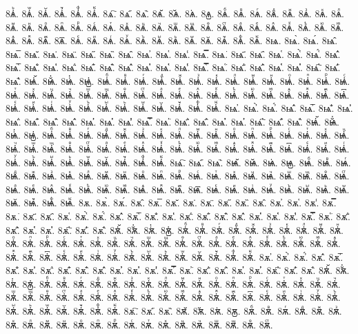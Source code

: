 {8ѧ҆ꙺ.
8ѧ҆ꙻ.
8ѧ҆꙼.
8ѧ҆꙽.
8ѧ҆ꚞ.
8ѧ҆ꚟ.
8ѧ҇.
8ѧ᷀.
8ѧ᷁.
8ѧ᷶.
8ѧ᷷.
8ѧ᷸.
8ѧ᷹.
8ѧⷠ.
8ѧⷡ.
8ѧⷢ.
8ѧⷣ.
8ѧⷤ.
8ѧⷥ.
8ѧⷦ.
8ѧⷧ.
8ѧⷨ.
8ѧⷩ.
8ѧⷪ.
8ѧⷫ.
8ѧⷬ.
8ѧⷭ.
8ѧⷮ.
8ѧⷯ.
8ѧⷰ.
8ѧⷱ.
8ѧⷲ.
8ѧⷳ.
8ѧⷴ.
8ѧⷵ.
8ѧⷶ.
8ѧⷷ.
8ѧⷸ.
8ѧⷹ.
8ѧⷺ.
8ѧⷻ.
8ѧⷼ.
8ѧⷽ.
8ѧⷾ.
8ѧⷿ.
8ѧ꙯.
8ѧꙴ.
8ѧꙵ.
8ѧꙶ.
8ѧꙷ.
8ѧꙸ.
8ѧꙹ.
8ѧꙺ.
8ѧꙻ.
8ѧ꙼.
8ѧ꙽.
8ѧꚞ.
8ѧꚟ.
8ѩ.
8ѩ̀.
8ѩ́.
8ѩ̂.
8ѩ̅.
8ѩ̆.
8ѩ̇.
8ѩ̈.
8ѩ̋.
8ѩ̏.
8ѩ̑.
8ѩ̓.
8ѩ̔.
8ѩ̾.
8ѩ̿.
8ѩ͘.
8ѩ҃.
8ѩ҄.
8ѩ҅.
8ѩ҅̀.
8ѩ҅́.
8ѩ҅̂.
8ѩ҅̅.
8ѩ҅̆.
8ѩ҅̇.
8ѩ҅̈.
8ѩ҅̋.
8ѩ҅̏.
8ѩ҅̑.
8ѩ҅̓.
8ѩ҅̔.
8ѩ҅̾.
8ѩ҅̿.
8ѩ҅͘.
8ѩ҅҃.
8ѩ҅҄.
8ѩ҅҅.
8ѩ҅҆.
8ѩ҅҇.
8ѩ҅᷀.
8ѩ҅᷁.
8ѩ҅᷶.
8ѩ᷷҅.
8ѩ᷸҅.
8ѩ᷹҅.
8ѩ҅ⷠ.
8ѩ҅ⷡ.
8ѩ҅ⷢ.
8ѩ҅ⷣ.
8ѩ҅ⷤ.
8ѩ҅ⷥ.
8ѩ҅ⷦ.
8ѩ҅ⷧ.
8ѩ҅ⷨ.
8ѩ҅ⷩ.
8ѩ҅ⷪ.
8ѩ҅ⷫ.
8ѩ҅ⷬ.
8ѩ҅ⷭ.
8ѩ҅ⷮ.
8ѩ҅ⷯ.
8ѩ҅ⷰ.
8ѩ҅ⷱ.
8ѩ҅ⷲ.
8ѩ҅ⷳ.
8ѩ҅ⷴ.
8ѩ҅ⷵ.
8ѩ҅ⷶ.
8ѩ҅ⷷ.
8ѩ҅ⷸ.
8ѩ҅ⷹ.
8ѩ҅ⷺ.
8ѩ҅ⷻ.
8ѩ҅ⷼ.
8ѩ҅ⷽ.
8ѩ҅ⷾ.
8ѩ҅ⷿ.
8ѩ҅꙯.
8ѩ҅ꙴ.
8ѩ҅ꙵ.
8ѩ҅ꙶ.
8ѩ҅ꙷ.
8ѩ҅ꙸ.
8ѩ҅ꙹ.
8ѩ҅ꙺ.
8ѩ҅ꙻ.
8ѩ҅꙼.
8ѩ҅꙽.
8ѩ҅ꚞ.
8ѩ҅ꚟ.
8ѩ҆.
8ѩ҆̀.
8ѩ҆́.
8ѩ҆̂.
8ѩ҆̅.
8ѩ҆̆.
8ѩ҆̇.
8ѩ҆̈.
8ѩ҆̋.
8ѩ҆̏.
8ѩ҆̑.
8ѩ҆̓.
8ѩ҆̔.
8ѩ҆̾.
8ѩ҆̿.
8ѩ҆͘.
8ѩ҆҃.
8ѩ҆҄.
8ѩ҆҅.
8ѩ҆҆.
8ѩ҆҇.
8ѩ҆᷀.
8ѩ҆᷁.
8ѩ҆᷶.
8ѩ᷷҆.
8ѩ᷸҆.
8ѩ᷹҆.
8ѩ҆ⷠ.
8ѩ҆ⷡ.
8ѩ҆ⷢ.
8ѩ҆ⷣ.
8ѩ҆ⷤ.
8ѩ҆ⷥ.
8ѩ҆ⷦ.
8ѩ҆ⷧ.
8ѩ҆ⷨ.
8ѩ҆ⷩ.
8ѩ҆ⷪ.
8ѩ҆ⷫ.
8ѩ҆ⷬ.
8ѩ҆ⷭ.
8ѩ҆ⷮ.
8ѩ҆ⷯ.
8ѩ҆ⷰ.
8ѩ҆ⷱ.
8ѩ҆ⷲ.
8ѩ҆ⷳ.
8ѩ҆ⷴ.
8ѩ҆ⷵ.
8ѩ҆ⷶ.
8ѩ҆ⷷ.
8ѩ҆ⷸ.
8ѩ҆ⷹ.
8ѩ҆ⷺ.
8ѩ҆ⷻ.
8ѩ҆ⷼ.
8ѩ҆ⷽ.
8ѩ҆ⷾ.
8ѩ҆ⷿ.
8ѩ҆꙯.
8ѩ҆ꙴ.
8ѩ҆ꙵ.
8ѩ҆ꙶ.
8ѩ҆ꙷ.
8ѩ҆ꙸ.
8ѩ҆ꙹ.
8ѩ҆ꙺ.
8ѩ҆ꙻ.
8ѩ҆꙼.
8ѩ҆꙽.
8ѩ҆ꚞ.
8ѩ҆ꚟ.
8ѩ҇.
8ѩ᷀.
8ѩ᷁.
8ѩ᷶.
8ѩ᷷.
8ѩ᷸.
8ѩ᷹.
8ѩⷠ.
8ѩⷡ.
8ѩⷢ.
8ѩⷣ.
8ѩⷤ.
8ѩⷥ.
8ѩⷦ.
8ѩⷧ.
8ѩⷨ.
8ѩⷩ.
8ѩⷪ.
8ѩⷫ.
8ѩⷬ.
8ѩⷭ.
8ѩⷮ.
8ѩⷯ.
8ѩⷰ.
8ѩⷱ.
8ѩⷲ.
8ѩⷳ.
8ѩⷴ.
8ѩⷵ.
8ѩⷶ.
8ѩⷷ.
8ѩⷸ.
8ѩⷹ.
8ѩⷺ.
8ѩⷻ.
8ѩⷼ.
8ѩⷽ.
8ѩⷾ.
8ѩⷿ.
8ѩ꙯.
8ѩꙴ.
8ѩꙵ.
8ѩꙶ.
8ѩꙷ.
8ѩꙸ.
8ѩꙹ.
8ѩꙺ.
8ѩꙻ.
8ѩ꙼.
8ѩ꙽.
8ѩꚞ.
8ѩꚟ.
8ѫ.
8ѫ̀.
8ѫ́.
8ѫ̂.
8ѫ̅.
8ѫ̆.
8ѫ̇.
8ѫ̈.
8ѫ̋.
8ѫ̏.
8ѫ̑.
8ѫ̓.
8ѫ̔.
8ѫ̾.
8ѫ̿.
8ѫ͘.
8ѫ҃.
8ѫ҄.
8ѫ҅.
8ѫ҅̀.
8ѫ҅́.
8ѫ҅̂.
8ѫ҅̅.
8ѫ҅̆.
8ѫ҅̇.
8ѫ҅̈.
8ѫ҅̋.
8ѫ҅̏.
8ѫ҅̑.
8ѫ҅̓.
8ѫ҅̔.
8ѫ҅̾.
8ѫ҅̿.
8ѫ҅͘.
8ѫ҅҃.
8ѫ҅҄.
8ѫ҅҅.
8ѫ҅҆.
8ѫ҅҇.
8ѫ҅᷀.
8ѫ҅᷁.
8ѫ҅᷶.
8ѫ᷷҅.
8ѫ᷸҅.
8ѫ᷹҅.
8ѫ҅ⷠ.
8ѫ҅ⷡ.
8ѫ҅ⷢ.
8ѫ҅ⷣ.
8ѫ҅ⷤ.
8ѫ҅ⷥ.
8ѫ҅ⷦ.
8ѫ҅ⷧ.
8ѫ҅ⷨ.
8ѫ҅ⷩ.
8ѫ҅ⷪ.
8ѫ҅ⷫ.
8ѫ҅ⷬ.
8ѫ҅ⷭ.
8ѫ҅ⷮ.
8ѫ҅ⷯ.
8ѫ҅ⷰ.
8ѫ҅ⷱ.
8ѫ҅ⷲ.
8ѫ҅ⷳ.
8ѫ҅ⷴ.
8ѫ҅ⷵ.
8ѫ҅ⷶ.
8ѫ҅ⷷ.
8ѫ҅ⷸ.
8ѫ҅ⷹ.
8ѫ҅ⷺ.
8ѫ҅ⷻ.
8ѫ҅ⷼ.
8ѫ҅ⷽ.
8ѫ҅ⷾ.
8ѫ҅ⷿ.
8ѫ҅꙯.
8ѫ҅ꙴ.
8ѫ҅ꙵ.
8ѫ҅ꙶ.
8ѫ҅ꙷ.
8ѫ҅ꙸ.
8ѫ҅ꙹ.
8ѫ҅ꙺ.
8ѫ҅ꙻ.
8ѫ҅꙼.
8ѫ҅꙽.
8ѫ҅ꚞ.
8ѫ҅ꚟ.
8ѫ҆.
8ѫ҆̀.
8ѫ҆́.
8ѫ҆̂.
8ѫ҆̅.
8ѫ҆̆.
8ѫ҆̇.
8ѫ҆̈.
8ѫ҆̋.
8ѫ҆̏.
8ѫ҆̑.
8ѫ҆̓.
8ѫ҆̔.
8ѫ҆̾.
8ѫ҆̿.
8ѫ҆͘.
8ѫ҆҃.
8ѫ҆҄.
8ѫ҆҅.
8ѫ҆҆.
8ѫ҆҇.
8ѫ҆᷀.
8ѫ҆᷁.
8ѫ҆᷶.
8ѫ᷷҆.
8ѫ᷸҆.
8ѫ᷹҆.
8ѫ҆ⷠ.
8ѫ҆ⷡ.
8ѫ҆ⷢ.
8ѫ҆ⷣ.
8ѫ҆ⷤ.
8ѫ҆ⷥ.
8ѫ҆ⷦ.
8ѫ҆ⷧ.
8ѫ҆ⷨ.
8ѫ҆ⷩ.
8ѫ҆ⷪ.
8ѫ҆ⷫ.
8ѫ҆ⷬ.
8ѫ҆ⷭ.
8ѫ҆ⷮ.
8ѫ҆ⷯ.
8ѫ҆ⷰ.
8ѫ҆ⷱ.
8ѫ҆ⷲ.
8ѫ҆ⷳ.
8ѫ҆ⷴ.
8ѫ҆ⷵ.
8ѫ҆ⷶ.
8ѫ҆ⷷ.
8ѫ҆ⷸ.
8ѫ҆ⷹ.
8ѫ҆ⷺ.
8ѫ҆ⷻ.
8ѫ҆ⷼ.
8ѫ҆ⷽ.
8ѫ҆ⷾ.
8ѫ҆ⷿ.
8ѫ҆꙯.
8ѫ҆ꙴ.
8ѫ҆ꙵ.
8ѫ҆ꙶ.
8ѫ҆ꙷ.
8ѫ҆ꙸ.
8ѫ҆ꙹ.
8ѫ҆ꙺ.
8ѫ҆ꙻ.
8ѫ҆꙼.
8ѫ҆꙽.
8ѫ҆ꚞ.
8ѫ҆ꚟ.
8ѫ҇.
8ѫ᷀.
8ѫ᷁.
8ѫ᷶.
8ѫ᷷.
8ѫ᷸.
8ѫ᷹.
8ѫⷠ.
8ѫⷡ.
8ѫⷢ.
8ѫⷣ.
8ѫⷤ.
8ѫⷥ.
8ѫⷦ.
8ѫⷧ.
8ѫⷨ.
8ѫⷩ.
8ѫⷪ.
8ѫⷫ.
8ѫⷬ.
8ѫⷭ.
8ѫⷮ.
8ѫⷯ.
8ѫⷰ.
8ѫⷱ.
8ѫⷲ.
8ѫⷳ.
8ѫⷴ.
8ѫⷵ.
}
